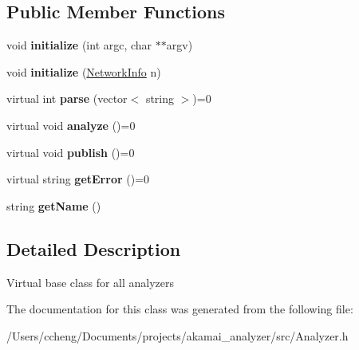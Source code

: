 \subsection*{Public Member Functions}
\begin{DoxyCompactItemize}
\item 
\mbox{\label{class_analyzer_a391ddc6ff8813f2af0a44339964dd182}} 
void {\bfseries initialize} (int argc, char $\ast$$\ast$argv)
\item 
\mbox{\label{class_analyzer_a236a6be53e03337ebc03a53883b0c0c9}} 
void {\bfseries initialize} (\mbox{\hyperlink{struct_network_info}{Network\+Info}} n)
\item 
\mbox{\label{class_analyzer_aea72fb1427846f406803266bb63484bf}} 
virtual int {\bfseries parse} (vector$<$ string $>$)=0
\item 
\mbox{\label{class_analyzer_a04ddbf427fc7fdc45b367cb04353b67a}} 
virtual void {\bfseries analyze} ()=0
\item 
\mbox{\label{class_analyzer_a5ac5b45598e4e05ccce9df87fc6ddfd8}} 
virtual void {\bfseries publish} ()=0
\item 
\mbox{\label{class_analyzer_a0fc82817f3b75c6a0968135675c1b3d1}} 
virtual string {\bfseries get\+Error} ()=0
\item 
\mbox{\label{class_analyzer_a19cd65a7c0abd2fdb8b285d9a0561321}} 
string {\bfseries get\+Name} ()
\end{DoxyCompactItemize}


\subsection{Detailed Description}
Virtual base class for all analyzers 

The documentation for this class was generated from the following file\+:\begin{DoxyCompactItemize}
\item 
/\+Users/ccheng/\+Documents/projects/akamai\+\_\+analyzer/src/Analyzer.\+h\end{DoxyCompactItemize}
